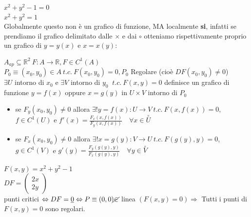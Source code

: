 \documentclass[a4paper, oneside]{article}
\begin{document}
    \begin{example}
        $x^2+y^2-1 = 0$\\
        $x^2+y^2 = 1$\\
        Globalmente questo non è un grafico di funzione, MA localmente \textbf{si}, infatti se prendiamo il grafico delimitato dalle $\times$ e dai $\circ$ otteniamo rispettivamente proprio un grafico di $y = y(x)$ e $x = x(y)$:
        \begin{center}
        \end{center}
    \end{example}


\begin{theorem}
    $A_{ap} \subseteq \mathbb{R}^2 \ F:A\to \mathbb{R}, F \in C^1 (A)$\\
     $P_0 \equiv (x_0,y_0) \in A \ t.c. \ F(x_0,y_0) = 0 , P_0 $ Regolare (cioè $DF(x_0,y_0)\neq 0$)\\
     $\exists U$ intorno di $x_0$ e $\exists V$ intorno di $y_0$ $ \ t.c. \ F(x,y) = 0$ definisce un grafico di funzione $y= f(x)$ oppure $x = g(y)$ in $U\times V$ intorno di $P_0$
    \\
    \begin{itemize}
        \item  se $F_y(x_0,y_0) \neq 0$ allora $\exists! y = f(x):U\to V \ t.c. \ F(x,f(x)) = 0$, $f \in C^1(U)$ e $ f'(x) = \frac{F_x(x,f(x))}{F_y(x,f(x))} \quad \forall x \in \overset{\circ}{U}$
        \item se $F_x(x_0,y_0) \neq 0$ allora $\exists! x = g(y): V \to U \ t.c. \ F(g(y),y) = 0$, $g \in C^1(V)$ e $g'(y) =\frac{F_y(g(y),y)}{F_x(g(y),y)} \quad \forall y \in \overset{\circ}{V}$
    \end{itemize}
    $F(x,y) = x^2+y^2-1$\\
    $DF = \begin{pmatrix}
        2x\\
        2y
    \end{pmatrix}$\\
    punti critici $\Leftrightarrow DF = \underbar{0} \Leftrightarrow P \equiv(0,0) \cancel{\in}$ linea $(F(x,y) = 0) \Rightarrow $ Tutti i punti di $F(x,y) = 0$ sono regolari.\\
\end{theorem}
\end{document}
